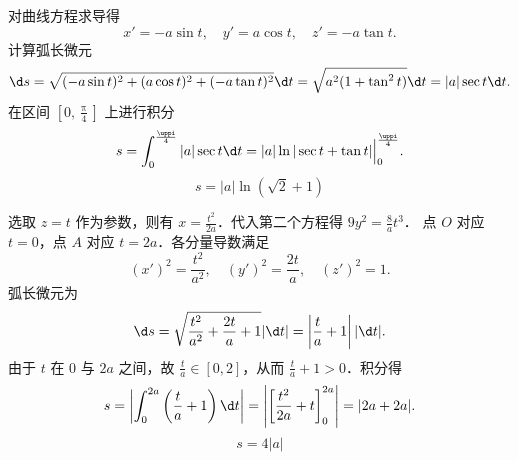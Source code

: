\begin{solution}
    对曲线方程求导得
    \begin{equation}
        x' = -a \sin t, \quad y' = a \cos t, \quad z' = -a \tan t.
    \end{equation}
    计算弧长微元
    \begin{equation}
        \d s = \sqrt{(-a\sin t)^2 + (a\cos t)^2 + (-a\tan t)^2} \d t = \sqrt{a^2(1 + \tan^2 t)} \d t = |a| \sec t \d t.
    \end{equation}
    在区间 $[0, \frac{\uppi}{4}]$ 上进行积分
    \begin{equation}
        s = \int_{0}^{\frac{\uppi}{4}} |a| \sec t \d t = |a| \ln |\sec t + \tan t| \Big|_0^{\frac{\uppi}{4}}.
    \end{equation}
    \begin{equation}
        \boxed{s = |a| \ln (\sqrt{2} + 1)}
    \end{equation}


    选取 $z = t$ 作为参数，则有 $x = \frac{t^2}{2a}$．代入第二个方程得 $9y^2 = \frac{8}{a}t^3$．
    点 $O$ 对应 $t=0$，点 $A$ 对应 $t=2a$．各分量导数满足
    \begin{equation}
        (x')^2 = \frac{t^2}{a^2}, \quad (y')^2 = \frac{2t}{a}, \quad (z')^2 = 1.
    \end{equation}
    弧长微元为
    \begin{equation}
        \d s = \sqrt{\frac{t^2}{a^2} + \frac{2t}{a} + 1} |\d t| = \left| \frac{t}{a} + 1 \right| |\d t|.
    \end{equation}
    由于 $t$ 在 $0$ 与 $2a$ 之间，故 $\frac{t}{a} \in [0, 2]$，从而 $\frac{t}{a} + 1 > 0$．积分得
    \begin{equation}
        s = \left| \int_{0}^{2a} \left( \frac{t}{a} + 1 \right) \d t \right| = \left| \left[ \frac{t^2}{2a} + t \right]_0^{2a} \right| = |2a + 2a|.
    \end{equation}
    \begin{equation}
        \boxed{s = 4|a|}
    \end{equation}



\end{solution}
